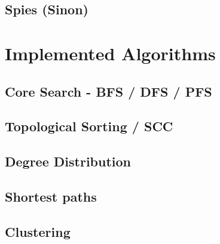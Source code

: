 	\subsection{Spies (Sinon)}
	\label{ssect:spies}


\section{Implemented Algorithms}
\label{sect:implemented_algos}

	\subsection{Core Search - BFS / DFS / PFS}
	\label{ssect:bfs_dfs}
	
	\subsection{Topological Sorting / SCC}
	\label{ssect:toposort_scc}
	
	\subsection{Degree Distribution}
	\label{ssect:deg_dist}
		
	\subsection{Shortest paths}
	\label{ssect:shortest_paths}
	
	\subsection{Clustering}
	\label{ssect:clustering}


